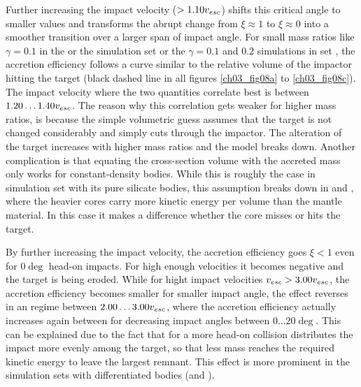 Further increasing the impact velocity ($> 1.10 v_{esc}$) shifts this critical angle to smaller values and transforms the abrupt change from $\xi \approx 1$ to $\xi \approx 0$ into a smoother transition over a larger span of impact angle. For small mass ratios like $\gamma = 0.1$ in the \css or the simulation set or the $\gamma = 0.1$ and $0.2$ simulations in set \rss, the accretion efficiency follows a curve similar to the relative volume of the impactor hitting the target (black dashed line in all figures \ref{ch03_fig08a} to \ref{ch03_fig08c}). The impact velocity where the two quantities correlate best is between $1.20 \dots 1.40 v_{esc}$. The reason why this correlation gets weaker for higher mass ratios, is because the simple volumetric guess assumes that the target is not changed considerably and simply cuts through the impactor. The alteration of the target increases with higher mass ratios and the model breaks down. Another complication is that equating the cross-section volume with the accreted mass only works for constant-density bodies. While this is roughly the case in simulation set \rss with its pure silicate bodies, this assumption breaks down in \css and \iss, where the heavier cores carry more kinetic energy per volume than the mantle material. In this case it makes a difference whether the core misses or hits the target. 

By further increasing the impact velocity, the accretion efficiency goes  $\xi < 1$ even for $0 \deg$ head-on impacts. For high enough velocities it becomes negative and the target is being eroded. While for hight impact velocities $v_{esc} > 3.00 v_{esc}$, the accretion efficiency becomes smaller for smaller impact angle, the effect reverses in an regime between $2.00 \dots 3.00 v_{esc}$, where the accretion efficiency actually increases again between for decreasing impact angles between $0 \dots 20 \deg$. This can be explained due to the fact that for a more head-on collision distributes the impact more evenly among the target, so that less mass reaches the required kinetic energy to leave the largest remnant. This effect is more prominent in the simulation sets with differentiated bodies (\css and \iss).

